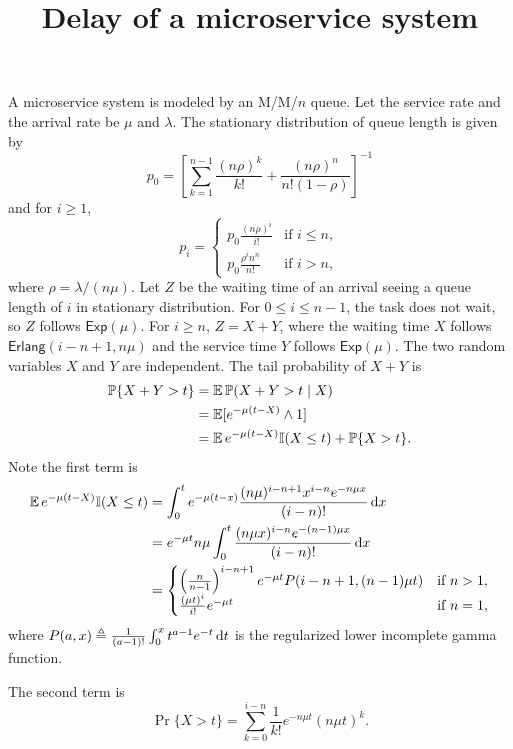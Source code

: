 \documentclass[12pt]{article}
\title{Delay of a microservice system}
\begin{document}
\maketitle

A microservice system is modeled by an M/M/$n$ queue.  Let the service
rate and the arrival rate be $\mu$ and $\lambda$.  The stationary
distribution of queue length is given by
\[p_0 = \left[\sum_{k = 1}^{n - 1}\frac{(n\rho)^k}{k!} + \frac{(n\rho)^n}{n!(1-\rho)}\right]^{-1}\]
and for $i \ge 1$,
\[p_i =
  \begin{cases}
    p_0\frac{(n\rho)^i}{i!} & \text{if }i \le n,\\
    p_0\frac{\rho^in^n}{n!} & \text{if }i > n,
  \end{cases}
\]
where $\rho = \lambda / (n\mu)$.  Let $Z$ be the waiting time of an
arrival seeing a queue length of $i$ in stationary distribution.  For
$0\le i \le n - 1$, the task does not wait, so $Z$ follows
$\mathsf{Exp}(\mu)$.  For $i\ge n$, $Z = X + Y$, where the waiting
time $X$ follows $\mathsf{Erlang}(i - n + 1, n\mu)$ and the service
time $Y$ follows $\mathsf{Exp}(\mu)$.  The two random variables $X$
and $Y$ are independent.  The tail probability of $X + Y$ is
\begin{align*}
  \operatorname{\mathbb P}\{X + Y > t\} & = \operatorname{\mathbb E}\operatorname{\mathbb P}(X + Y > t\mid X)\\
  & = \operatorname{\mathbb E}[e^{-\mu(t - X)}\wedge 1]\\
  & = \operatorname{\mathbb E} e^{-\mu(t - X)}\mathbb{I}(X \le t) + \operatorname{\mathbb P}\{X > t\}.
\end{align*}
Note the first term is
\begin{align*}
  \operatorname{\mathbb E} e^{-\mu(t - X)}\mathbb{I}(X \le t) & = \int_0^te^{-\mu(t - x)}\frac{(n\mu)^{i - n + 1}x^{i - n}e^{-n\mu x}}{(i - n)!}\mathop{}\!\mathrm{d} x\\
  & = e^{-\mu t}n\mu\int_0^t\frac{(n\mu x)^{i - n}e^{-(n - 1)\mu x}}{(i - n)!}\mathop{}\!\mathrm{d} x\\
  & =
    \begin{cases}
      \left(\frac n{n - 1}\right)^{i - n + 1}e^{-\mu t}P(i - n + 1, (n - 1)\mu t) & \text{if }n > 1,\\
      \frac{(\mu t)^i}{i!}e^{-\mu t} & \text{if }n = 1,
    \end{cases}
\end{align*}
where $P(a, x)\triangleq\frac 1{(a - 1)!}\int_0^xt^{a - 1}e^{-t}\mathop{}\!\mathrm{d} t$ is
the regularized lower incomplete gamma function.

The second term is
\[\Pr\{X > t\} = \sum_{k = 0}^{i - n}\frac 1{k!}e^{-n\mu t}(n\mu t)^k.\]

% 
% 
\end{document}

